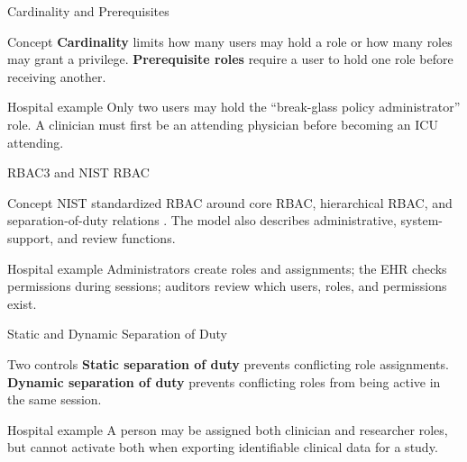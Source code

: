 \documentclass[presentation]{beamer}
\begin{document}
\begin{frame}[c]{Cardinality and Prerequisites}
\begin{block}{Concept}
\textbf{Cardinality} limits how many users may hold a role or how many roles may grant a privilege.
\textbf{Prerequisite roles} require a user to hold one role before receiving another.
\end{block}

\begin{exampleblock}{Hospital example}
Only two users may hold the ``break-glass policy administrator'' role. A clinician must first be an
attending physician before becoming an ICU attending.
\end{exampleblock}
\end{frame}

\begin{frame}[c]{RBAC3 and NIST RBAC}
\begin{block}{Concept}
NIST standardized RBAC around core RBAC, hierarchical RBAC, and separation-of-duty relations
\cite{nist_rbac}. The model also describes administrative, system-support, and review functions.
\end{block}

\begin{exampleblock}{Hospital example}
Administrators create roles and assignments; the EHR checks permissions during sessions; auditors
review which users, roles, and permissions exist.
\end{exampleblock}
\end{frame}

\begin{frame}[c]{Static and Dynamic Separation of Duty}
\begin{block}{Two controls}
\textbf{Static separation of duty} prevents conflicting role assignments. \textbf{Dynamic
separation of duty} prevents conflicting roles from being active in the same session.
\end{block}

\begin{exampleblock}{Hospital example}
A person may be assigned both clinician and researcher roles, but cannot activate both when
exporting identifiable clinical data for a study.
\end{exampleblock}
\end{frame}
\end{document}
